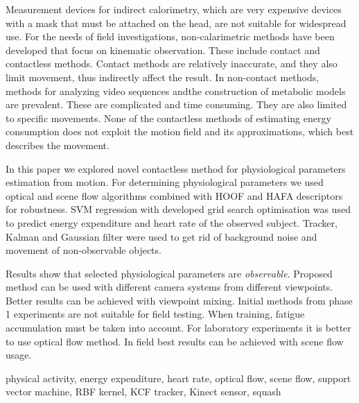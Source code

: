 \abstractp
Measurement devices for indirect calorimetry, which are very expensive devices with a mask that must be attached on the head, are not suitable for widespread use. For the needs of field investigations, non-calarimetric methods have been developed that focus on kinematic observation. These include contact and contactless methods. Contact methods are relatively inaccurate, and they also limit movement, thus indirectly affect the result. In non-contact methods, methods for analyzing video sequences andthe construction of metabolic models are prevalent. These are complicated and time consuming. They are also limited to specific movements. None of the contactless methods of estimating energy consumption does not exploit the motion field and its approximations, which best describes the movement.

In this paper we explored novel contactless method for physiological parameters estimation from motion. For determining physiological parameters we used optical and scene flow algorithms combined with HOOF and HAFA descriptors for robustness. SVM regression with developed \nurbf grid search optimisation was used to predict energy expenditure and heart rate of the observed subject. Tracker, Kalman and Gaussian filter were used to get rid of background noise and movement of non-observable objects.

Results show that selected physiological parameters are \emph{observable}. Proposed method can be used with different camera systems from different viewpoints. Better results can be achieved with viewpoint mixing. Initial methods from phase 1 experiments are not suitable for field testing. When training, fatigue accumulation must be taken into account. For laboratory experiments it is better to use optical flow method. In field best results can be achieved with scene flow usage.

\keywords physical activity, energy expenditure, heart rate, optical flow, scene flow, support vector machine, RBF kernel, KCF tracker, Kinect sensor, squash